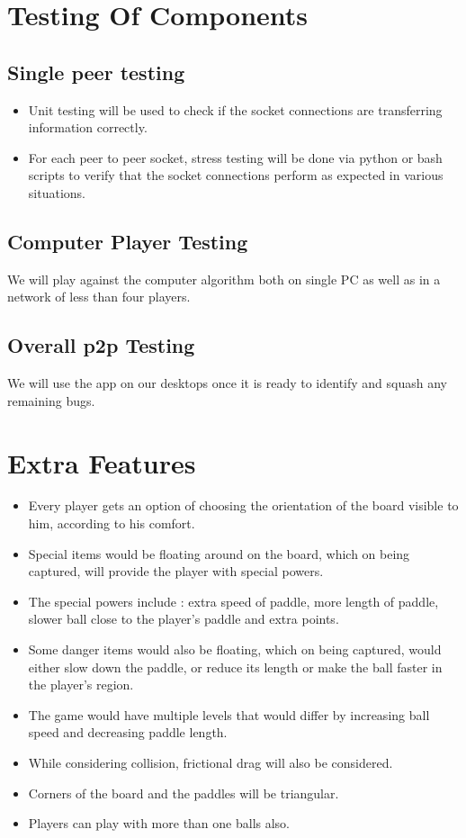 \documentclass{article}
\begin{document}
	\section{Testing Of Components}
			\subsection{Single peer testing}
				\begin{itemize}
					\item Unit testing will be used to check if the socket connections are transferring information correctly.
					\item For each peer to peer socket, stress testing will be done via python or bash scripts to verify that the socket connections perform as expected in various situations.
				\end{itemize}

			\subsection{Computer Player Testing}
			We will play against the computer algorithm both on single PC as well as in a network of less than four players.
			\subsection{Overall p2p Testing}
				We will use the app on our desktops once it is ready to identify and squash any remaining bugs.
	\section{Extra Features}
	\begin{itemize}
	\item Every player gets an option of choosing the orientation of the board visible to him, according to his comfort.
	\item Special items would be floating around on the board, which on being captured, will provide the player with special powers.
	\item The special powers include : extra speed of paddle, more length of paddle, slower ball close to the player's paddle and extra points.
	\item Some danger items would also be floating, which on being captured, would either slow down the paddle, or reduce its length or make the ball faster in the player's region.
	\item The game would have multiple levels that would differ by increasing ball speed and decreasing paddle length.
	\item While considering collision, frictional drag will also be considered.
	\item Corners of the board and the paddles will be triangular.
	\item Players can play with more than one balls also.
	\end{itemize}
\end{document}
